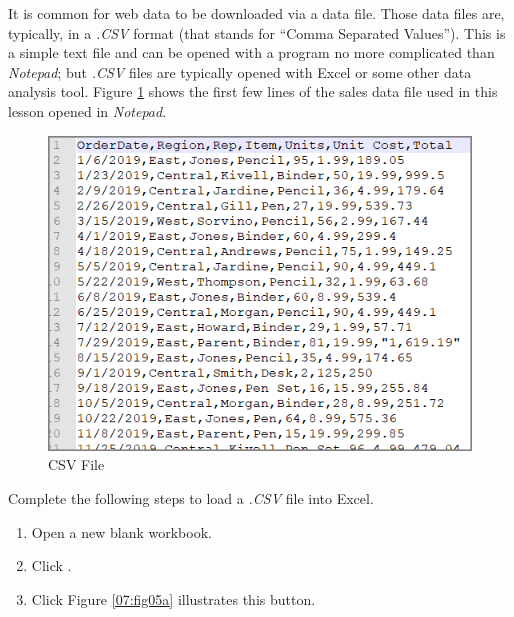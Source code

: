It is common for web data to be downloaded via a data file. Those data files are, typically, in a \textit{.CSV} format (that stands for ``Comma Separated Values''). This is a simple text file and can be opened with a program no more complicated than \textit{Notepad}; but \textit{.CSV} files are typically opened with Excel or some other data analysis tool. Figure \ref{07:fig04} shows the first few lines of the sales data file used in this lesson opened in \textit{Notepad}.

\begin{figure}[H]
	\centering
	\includegraphics[width=\maxwidth{.95\linewidth}]{gfx/ch07_fig04}
	\caption{CSV File}
	\label{07:fig04}
\end{figure}

Complete the following steps to load a \textit{.CSV} file into Excel.

\begin{enumerate}
	\item Open a new blank workbook.
	\item {} Click .
	\item {} Click 
	Figure \ref{07:fig05a} illustrates this button.
\end{enumerate}


